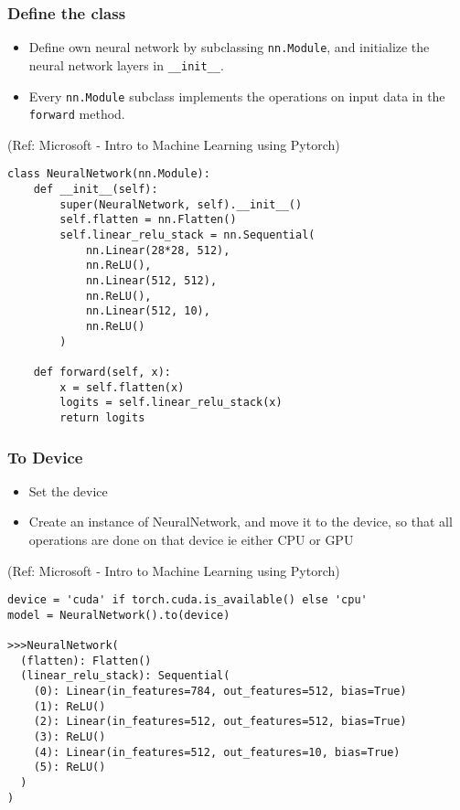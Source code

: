 \begin{frame}[fragile] \frametitle{Define the class}

\begin{itemize}
\item Define own neural network by subclassing \lstinline|nn.Module|, and initialize the neural network layers in \lstinline|__init__|. 
\item Every \lstinline|nn.Module| subclass implements the operations on input data in the \lstinline|forward| method.
\end{itemize}

\tiny{(Ref: Microsoft - Intro to Machine Learning using Pytorch)}

\begin{lstlisting}
class NeuralNetwork(nn.Module):
    def __init__(self):
        super(NeuralNetwork, self).__init__()
        self.flatten = nn.Flatten()
        self.linear_relu_stack = nn.Sequential(
            nn.Linear(28*28, 512),
            nn.ReLU(),
            nn.Linear(512, 512),
            nn.ReLU(),
            nn.Linear(512, 10),
            nn.ReLU()
        )

    def forward(self, x):
        x = self.flatten(x)
        logits = self.linear_relu_stack(x)
        return logits
\end{lstlisting}

\end{frame}

\begin{frame}[fragile] \frametitle{To Device}

\begin{itemize}
\item Set the device
\item Create an instance of NeuralNetwork, and move it to the device, so that all operations are done on that device ie either CPU or GPU
\end{itemize}

\tiny{(Ref: Microsoft - Intro to Machine Learning using Pytorch)}

\begin{lstlisting}
device = 'cuda' if torch.cuda.is_available() else 'cpu'
model = NeuralNetwork().to(device)

>>>NeuralNetwork(
  (flatten): Flatten()
  (linear_relu_stack): Sequential(
    (0): Linear(in_features=784, out_features=512, bias=True)
    (1): ReLU()
    (2): Linear(in_features=512, out_features=512, bias=True)
    (3): ReLU()
    (4): Linear(in_features=512, out_features=10, bias=True)
    (5): ReLU()
  )
)
\end{lstlisting}

\end{frame}

